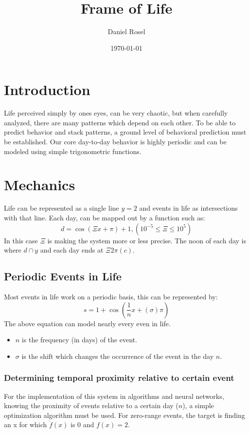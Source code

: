 \documentclass[11pt]{article}
\author{Daniel Rosel}
\date{\today}
\title{Frame of Life}
\begin{document}
\maketitle
\tableofcontents


\section{Introduction}
\label{sec:orgd6cb32a}
Life perceived simply by ones eyes, can be very chaotic, but when carefully analyzed, there are many patterns which depend on each other. To be able to predict behavior and stack patterns, a ground level of behavioral prediction must be established. Our core day-to-day behavior is highly periodic and can be modeled using simple trigonometric functions.
\section{Mechanics}
\label{sec:org9d14330}
Life can be represented as a single line \(y = 2\) and events in life as intersections with that line. Each day, can be mapped out by a function such as:
\begin{equation}
    d = \cos{(\Xi x + \pi) + 1}, (10^{-5} \leq \Xi \leq 10^{5})
\end{equation}
In this case \(\Xi\) is making the system more or less precise. The noon of each day is where \(d \cap y\) and each day ends at \(\Xi2\pi(c)\).
\subsection{Periodic Events in Life}
\label{sec:org3941c4f}
Most events in life work on a periodic basis, this can be represented by:
\begin{equation}
s = 1 + \cos{(\frac{1}{n}x + (\sigma)\pi)}
\end{equation}
The above equation can model nearly every even in life.
\begin{itemize}
\item \(n\) is the frequency (in days) of the event.
\item \(\sigma\) is the shift which changes the occurrence of the event in the day \(n\).
\end{itemize}
\subsubsection{Determining temporal proximity relative to certain event}
\label{sec:org9dd90ac}
For the implementation of this system in algorithms and neural networks, knowing the proximity of events relative to a certain day (\(n\)), a simple optimization algorithm must be used. For zero-range events, the target is finding an x for which \(\dot{f}(x)\) is 0 and \(f(x) = 2\).
\end{document}
